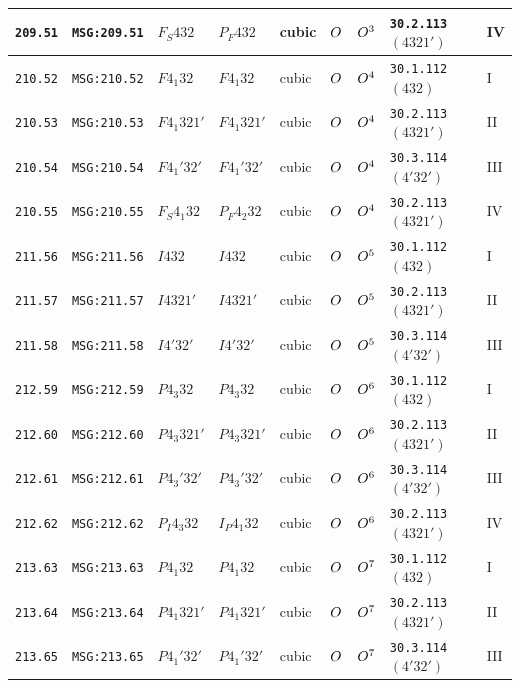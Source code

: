 \documentclass[fleqn,10pt]{jsarticle}
\begin{document}
\begin{center}
\begin{longtable}{lllllllll}
\texttt{209.51} & \texttt{MSG:209.51} & $F_{S}432$ & $P_{F}432$ & cubic & $O_{\rm }$ & $O_{\rm }^{3}$ & \texttt{30.2.113} $(4321')$ & IV \\ \hline
\texttt{210.52} & \texttt{MSG:210.52} & $F4_{1}32$ & $F4_{1}32$ & cubic & $O_{\rm }$ & $O_{\rm }^{4}$ & \texttt{30.1.112} $(432)$ & I \\
\texttt{210.53} & \texttt{MSG:210.53} & $F4_{1}321'$ & $F4_{1}321'$ & cubic & $O_{\rm }$ & $O_{\rm }^{4}$ & \texttt{30.2.113} $(4321')$ & II \\
\texttt{210.54} & \texttt{MSG:210.54} & $F4_{1}'32'$ & $F4_{1}'32'$ & cubic & $O_{\rm }$ & $O_{\rm }^{4}$ & \texttt{30.3.114} $(4'32')$ & III \\
\texttt{210.55} & \texttt{MSG:210.55} & $F_{S}4_{1}32$ & $P_{F}4_{2}32$ & cubic & $O_{\rm }$ & $O_{\rm }^{4}$ & \texttt{30.2.113} $(4321')$ & IV \\ \hline
\texttt{211.56} & \texttt{MSG:211.56} & $I432$ & $I432$ & cubic & $O_{\rm }$ & $O_{\rm }^{5}$ & \texttt{30.1.112} $(432)$ & I \\
\texttt{211.57} & \texttt{MSG:211.57} & $I4321'$ & $I4321'$ & cubic & $O_{\rm }$ & $O_{\rm }^{5}$ & \texttt{30.2.113} $(4321')$ & II \\
\texttt{211.58} & \texttt{MSG:211.58} & $I4'32'$ & $I4'32'$ & cubic & $O_{\rm }$ & $O_{\rm }^{5}$ & \texttt{30.3.114} $(4'32')$ & III \\ \hline
\texttt{212.59} & \texttt{MSG:212.59} & $P4_{3}32$ & $P4_{3}32$ & cubic & $O_{\rm }$ & $O_{\rm }^{6}$ & \texttt{30.1.112} $(432)$ & I \\
\texttt{212.60} & \texttt{MSG:212.60} & $P4_{3}321'$ & $P4_{3}321'$ & cubic & $O_{\rm }$ & $O_{\rm }^{6}$ & \texttt{30.2.113} $(4321')$ & II \\
\texttt{212.61} & \texttt{MSG:212.61} & $P4_{3}'32'$ & $P4_{3}'32'$ & cubic & $O_{\rm }$ & $O_{\rm }^{6}$ & \texttt{30.3.114} $(4'32')$ & III \\
\texttt{212.62} & \texttt{MSG:212.62} & $P_{I}4_{3}32$ & $I_{P}4_{1}32$ & cubic & $O_{\rm }$ & $O_{\rm }^{6}$ & \texttt{30.2.113} $(4321')$ & IV \\ \hline
\texttt{213.63} & \texttt{MSG:213.63} & $P4_{1}32$ & $P4_{1}32$ & cubic & $O_{\rm }$ & $O_{\rm }^{7}$ & \texttt{30.1.112} $(432)$ & I \\
\texttt{213.64} & \texttt{MSG:213.64} & $P4_{1}321'$ & $P4_{1}321'$ & cubic & $O_{\rm }$ & $O_{\rm }^{7}$ & \texttt{30.2.113} $(4321')$ & II \\
\texttt{213.65} & \texttt{MSG:213.65} & $P4_{1}'32'$ & $P4_{1}'32'$ & cubic & $O_{\rm }$ & $O_{\rm }^{7}$ & \texttt{30.3.114} $(4'32')$ & III \\

\end{longtable}
\end{center}
\end{document}

